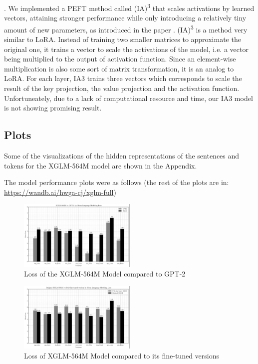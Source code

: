 \documentclass[11pt]{article}
\newcommand{\customsection}[1]{
  \noindent\textbf{#1}.\vspace{2mm}
}
\begin{document}
\customsection{} We implemented a PEFT method called (IA)\textsuperscript{3} that scales activations by learned vectors, attaining stronger performance while only introducing a relatively tiny amount of new parameters, as introduced in the paper \cite{liu2022fewshot}.
(IA)\textsuperscript{3} is a method very similar to LoRA. Instead of training two smaller matrices to approximate the original one,
it trains a vector to scale the activations of the model, i.e. a vector being multiplied to the output of activation function.
Since an element-wise multiplication is also some sort of matrix transformation, it is an analog to LoRA.
For each layer, IA3 trains three vectors which corresponds to scale the result of the key projection, the value projection and the activation function.
Unfortuneately, due to a lack of computational resource and time, our IA3 model is not showing promising result.

\subsection{Plots}

Some of the visualizations of the hidden representations of the sentences and tokens for the XGLM-564M model are shown in the Appendix.

The model performance plots were as follows (the rest of the plots are in: \url{https://wandb.ai/hwga-cj/xglm-full})

\begin{figure}[h]
    \centering
    \includegraphics[width=0.5\textwidth]{plots/xglm_vs_gpt2_mean_losses.png}
    \caption{Loss of the XGLM-564M Model compared to GPT-2}
\end{figure}

\begin{figure}[h]
    \centering
    \includegraphics[width=0.5\textwidth]{plots/xglm_vs_finetuned.png}
    \caption{Loss of XGLM-564M Model compared to its fine-tuned versions}
\end{figure}
\end{document}
